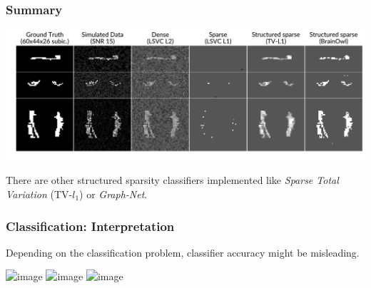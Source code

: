 \documentclass[11pt]{beamer}
\begin{document}
\appendix
\begin{frame}
    \frametitle{Summary}
    
    \begin{center}
        \includegraphics[scale=0.35]{figures/template_and_weights_4_clfs.png}
    \end{center}

    There are other structured sparsity classifiers implemented like
    \emph{Sparse Total Variation} (TV-$l_1$) or
    \emph{Graph-Net}.


\end{frame}
\begin{frame}
  \frametitle{Classification: Interpretation}
  Depending on the classification problem, classifier accuracy might be
  misleading. 
  \begin{center}
    \includegraphics<1>[scale=0.22]{figures/moons_circles_linear_clf_1.png}
    \includegraphics<2>[scale=0.22]{figures/moons_circles_linear_clf_2.png}
    \includegraphics<3>[scale=0.22]{figures/moons_circles_linear_clf.png}
  \end{center}
\end{frame}
\end{document}
